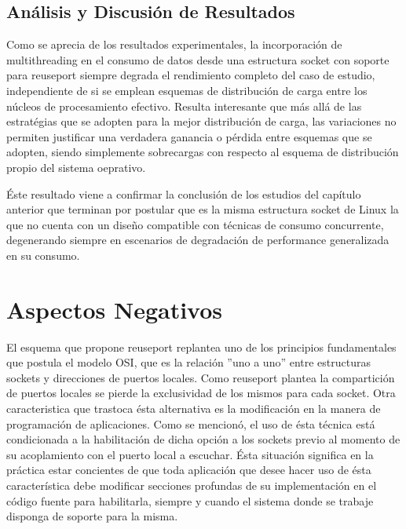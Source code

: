 \subsection{Análisis y Discusión de Resultados}
Como se aprecia de los resultados experimentales, la incorporación de multithreading en el consumo de datos desde una estructura socket con soporte para reuseport siempre degrada el rendimiento completo del caso de estudio, independiente de si se emplean esquemas de distribución de carga entre los núcleos de procesamiento efectivo. Resulta interesante que más allá de las estratégias que se adopten para la mejor distribución de carga, las variaciones no permiten justificar una verdadera ganancia o pérdida entre esquemas que se adopten, siendo simplemente sobrecargas con respecto al esquema de distribución propio del sistema oeprativo.

Éste resultado viene a confirmar la conclusión de los estudios del capítulo anterior que terminan por postular que es la misma estructura socket de Linux la que no cuenta con un diseño compatible con técnicas de consumo concurrente, degenerando siempre en escenarios de degradación de performance generalizada en su consumo.

\section{Aspectos Negativos}
El esquema que propone reuseport replantea uno de los principios fundamentales que postula el modelo OSI, que es la relación ''uno a uno'' entre estructuras sockets y direcciones de puertos locales. Como reuseport plantea la compartición de puertos locales se pierde la exclusividad de los mismos para cada socket. Otra caracteristica que trastoca ésta alternativa es la modificación en la manera de programación de aplicaciones. Como se mencionó, el uso de ésta técnica está condicionada a la habilitación de dicha opción a los sockets previo al momento de su acoplamiento con el puerto local a escuchar. Ésta situación significa en la práctica estar concientes de que toda aplicación que desee hacer uso de ésta característica debe modificar secciones profundas de su implementación en el código fuente para habilitarla, siempre y cuando el sistema donde se trabaje disponga de soporte para la misma.

